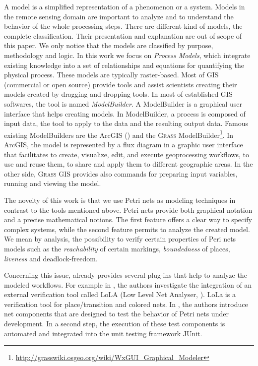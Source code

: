 \label{sec:relatedwork}
%
A model is a simplified representation of a phenomenon or a system.
%
Models in the remote sensing domain are important to analyze and to understand the behavior of the whole processing steps.
%
There are different kind of models, the complete classification.
%
Their presentation and explanation are out of scope of this paper.
%
We only notice that the models are classified by purpose, methodology and logic.
%
In this work we focus on \textit{Process Models}, which integrate existing knowledge into a set of relationships and equations for quantifying the physical process.
%
These models are typically raster-based.
%
Most of GIS (commercial or open source) provide tools and assist scientists creating their models created by dragging and dropping tools. 
%
In most of established GIS softwares, the tool is named \textit{ModelBuilder}.
%
A ModelBuilder is a graphical user interface that helps creating models. 
%
In ModelBuilder, a process is composed of input data, the tool to apply to the data and the resulting output data. 
%
Famous existing ModelBuilders are the ArcGIS (\cite{Armstrong09}) and the \textsc{Grass} ModelBuilder\footnote{\url{http://grasswiki.osgeo.org/wiki/WxGUI_Graphical_Modeler}}.
%
In ArcGIS, the model is represented by a flux diagram in a graphic user interface that facilitates to create, visualize, edit, and execute geoprocessing workflows, to use and reuse them, to share and apply them to different geographic areas.
%
In the other side, \textsc{Grass} GIS provides also commands for preparing input variables, running and viewing the model.    
%

The novelty of this work is that we use Petri nets as modeling techniques in contrast to the tools mentioned above.
%
Petri nets provide both graphical notation and a precise mathematical notions.
%
The first feature offers a clear way to specify complex systems, while the second feature permits to analyze the created model.
%
We mean by analysis, the possibility to verify certain properties of Peri nets models such as the \emph{reachability} of certain markings, \emph{boundedness} of places, \emph{liveness} and deadlock-freedom.

%
Concerning this issue, \Renew{} already provides several plug-ins that help to analyze the modeled workflows.
%
For example in \cite{Hewelt+11}, the authors investigate the integration of an external verification tool called LoLA (Low Level Net Analyser, \cite{Karsten+00}).
%
LoLa is a verification tool for place/transition and colored nets.
%
In \cite{Cabac+11}, the authors introduce net components that are designed to test the behavior of Petri nets under development.
%
In a second step, the execution of these test components is automated and integrated into the unit testing framework JUnit. 
%


